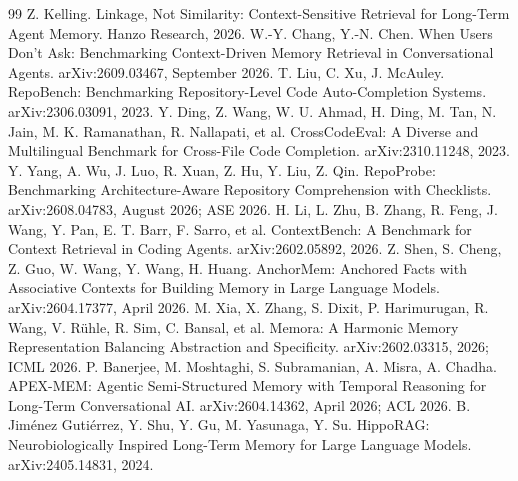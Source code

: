 \documentclass[11pt]{article}
\begin{document}
\begin{thebibliography}{99}
 Z. Kelling. Linkage, Not Similarity: Context-Sensitive Retrieval
  for Long-Term Agent Memory. Hanzo Research, 2026.
 W.-Y. Chang, Y.-N. Chen. When Users Don't Ask: Benchmarking
  Context-Driven Memory Retrieval in Conversational Agents. arXiv:2609.03467, September 2026.
 T. Liu, C. Xu, J. McAuley. RepoBench: Benchmarking Repository-Level
  Code Auto-Completion Systems. arXiv:2306.03091, 2023.
 Y. Ding, Z. Wang, W. U. Ahmad, H. Ding, M. Tan, N. Jain,
  M. K. Ramanathan, R. Nallapati, et al. CrossCodeEval: A Diverse and Multilingual
  Benchmark for Cross-File Code Completion. arXiv:2310.11248, 2023.
 Y. Yang, A. Wu, J. Luo, R. Xuan, Z. Hu, Y. Liu, Z. Qin. RepoProbe:
  Benchmarking Architecture-Aware Repository Comprehension with Checklists.
  arXiv:2608.04783, August 2026; ASE 2026.
 H. Li, L. Zhu, B. Zhang, R. Feng, J. Wang, Y. Pan, E. T. Barr,
  F. Sarro, et al. ContextBench: A Benchmark for Context Retrieval in Coding Agents.
  arXiv:2602.05892, 2026.
 Z. Shen, S. Cheng, Z. Guo, W. Wang, Y. Wang, H. Huang. AnchorMem:
  Anchored Facts with Associative Contexts for Building Memory in Large Language Models.
  arXiv:2604.17377, April 2026.
 M. Xia, X. Zhang, S. Dixit, P. Harimurugan, R. Wang, V. R\"uhle, R. Sim,
  C. Bansal, et al. Memora: A Harmonic Memory Representation Balancing Abstraction and
  Specificity. arXiv:2602.03315, 2026; ICML 2026.
 P. Banerjee, M. Moshtaghi, S. Subramanian, A. Misra, A. Chadha. APEX-MEM:
  Agentic Semi-Structured Memory with Temporal Reasoning for Long-Term Conversational AI.
  arXiv:2604.14362, April 2026; ACL 2026.
 B. Jim\'enez Guti\'errez, Y. Shu, Y. Gu, M. Yasunaga, Y. Su. HippoRAG:
  Neurobiologically Inspired Long-Term Memory for Large Language Models. arXiv:2405.14831, 2024.
\end{thebibliography}
\end{document}
